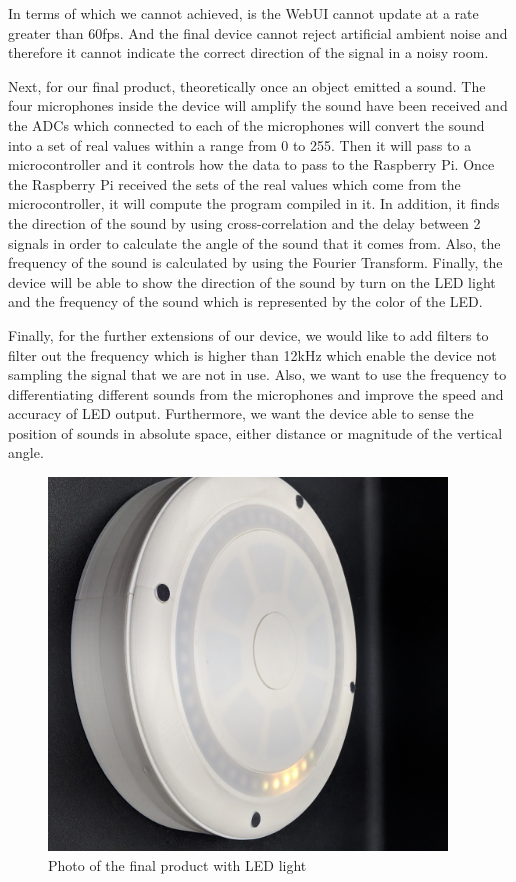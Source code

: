 \documentclass[a4paper]{article}
\begin{document}
In terms of which we cannot achieved, is the WebUI cannot update at a rate
greater than 60fps. And the final device cannot reject artificial ambient noise
and therefore it cannot indicate the correct direction of the signal in a noisy
room.

Next, for our final product, theoretically once an object emitted a sound. The
four microphones inside the device will amplify the sound have been received and
the ADCs which connected to each of the microphones will convert the sound into
a set of real values within a range from 0 to 255. Then it will pass to a
microcontroller and it controls how the data to pass to the Raspberry Pi. Once
the Raspberry Pi received the sets of the real values which come from the
microcontroller, it will compute the program compiled in it. In addition, it
finds the direction of the sound by using cross-correlation and the delay
between 2 signals in order to calculate the angle of the sound that it comes
from. Also, the frequency of the sound is calculated by using the Fourier
Transform. Finally, the device will be able to show the direction of the sound
by turn on the LED light and the frequency of the sound which is represented by
the color of the LED.

Finally, for the further extensions of our device, we would like to add filters
to filter out the frequency which is higher than 12kHz which enable the device
not sampling the signal that we are not in use. Also, we want to use the
frequency to differentiating different sounds from the microphones and improve
the speed and accuracy of LED output.  Furthermore, we want the device able to
sense the position of sounds in absolute space, either distance or magnitude of
the vertical angle.

\begin{figure}[H]
\begin{center}
\includegraphics[width=300pt]{pictures/FinalProduct-cropped.jpg}
\caption{Photo of the final product with LED light}
\label{fig:finprod}
\end{center}
\end{figure}
\end{document}
